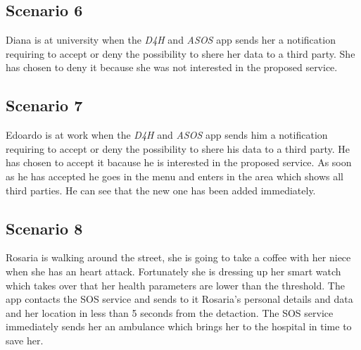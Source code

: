 \subsection{Scenario 6}
Diana is at university when the \textit{D4H} and \textit{ASOS} app sends her a notification requiring to accept or deny the possibility to shere her data to a third party.
She has chosen to deny it because she was not interested in the proposed service.

\subsection{Scenario 7}
Edoardo is at work when the \textit{D4H} and \textit{ASOS} app sends him a notification requiring to accept or deny the possibility to shere his data to a third party.
He has chosen to accept it bacause he is interested in the proposed service. As soon as he has accepted he goes in the menu and enters in the area which shows all third parties. He can see that the new one has been added immediately.

\subsection{Scenario 8}
Rosaria is walking around the street, she is going to take a coffee with her niece when she has an heart attack. Fortunately she is dressing up her smart watch which takes over that her health parameters are lower than the threshold. The app contacts the SOS service and sends to it Rosaria's personal details and data and her location in less than 5 seconds from the detaction. The SOS service immediately sends her an ambulance which brings her to the hospital in time to save her.
